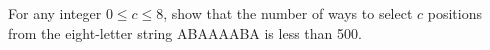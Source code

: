 For any integer $0\le c\le8$, show that the number of ways to select $c$ positions from the eight-letter string ABAAAABA is less than 500.
